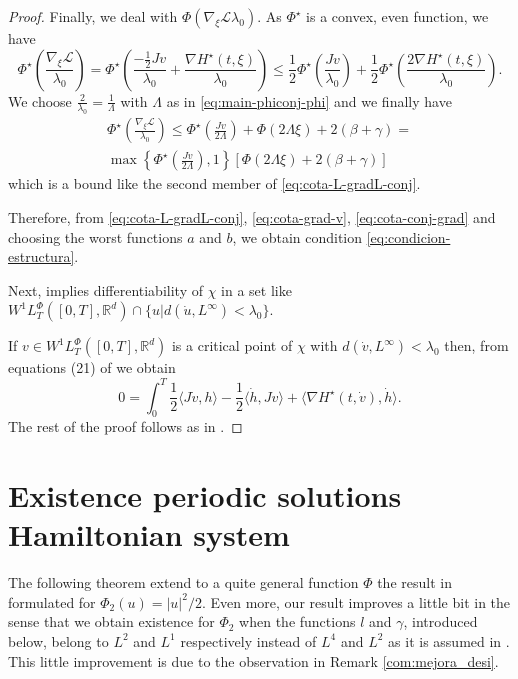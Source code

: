 \documentclass[twoside]{article}
\theoremstyle{remark}
\newcommand{\lphi}{L^{\Phi}}
\newcommand{\wphit}{W^{1}\lphi_T}
\newcommand{\rr}{\mathbb{R}}
\renewcommand{\leq}{\leqslant}
\begin{document}
\begin{proof}
Finally, we deal with $\Phi(\nabla_{\xi}\mathcal{L}{\lambda_0})$. 
As $\Phi^{\star}$ is a convex, even function, we have
\[\Phi^{\star}\left(\frac{\nabla_{\xi}\mathcal{L}}{\lambda_0}\right)=
\Phi^{\star}\left(\frac{-\frac{1}{2}Jv}{\lambda_0}+\frac{\nabla H^{\star}(t,\xi)}{\lambda_0}\right)
\leq
\frac{1}{2} \Phi^{\star}\left(\frac{Jv}{\lambda_0}\right)+
\frac{1}{2}\Phi^{\star}\left(\frac{2 \nabla H^{\star}(t,\xi)}{\lambda_0}\right).
\]
We choose $\frac{2}{\lambda_0}=\frac{1}{\Lambda}$ with $\Lambda$ as in \eqref{eq:main-phiconj-phi} and 
we finally have
\begin{equation}\label{eq:cota-conj-grad}
\begin{split}
\Phi^{\star}\left(\frac{\nabla_{\xi}\mathcal{L}}{\lambda_0}\right)\leq 
\Phi^{\star}\left(\frac{Jv}{2\Lambda}\right)+\Phi(2\Lambda\xi)+2(\beta+\gamma)=\\
\max\left\{\Phi^{\star}\left(\frac{Jv}{2\Lambda}\right),1\right\}
\left[\Phi(2\Lambda\xi)+2(\beta+\gamma)\right]
\end{split}
\end{equation}
which is a bound like the second member of \eqref{eq:cota-L-gradL-conj}.

Therefore, from \eqref{eq:cota-L-gradL-conj}, \eqref{eq:cota-grad-v}, \eqref{eq:cota-conj-grad} and choosing the worst functions $a$ and $b$, 
we obtain condition \eqref{eq:condicion-estructura}.

Next, \cite[Thm. 4.5]{MA2017} implies differentiability of $\chi$ in a set like 
$\wphit([0,T],\rr^d)\cap\{u|d(\dot{u},L^{\infty})<\lambda_0\}$.

If $v \in \wphit([0,T],\rr^d)$ is a critical point of $\chi$ with $d(\dot{v},L^{\infty})<\lambda_0$
then, from equations (21) of \cite{MA2017} we obtain
\[
0=\int_0^T \frac{1}{2} \langle J\dot{v},h\rangle-\frac{1}{2} \langle \dot{h},Jv \rangle
+\langle \nabla H^{\star}(t,\dot{v}),\dot{h} \rangle.
\]
The rest of the proof follows as in \cite{mawhin2010critical}.

\end{proof}


\section{Existence periodic solutions Hamiltonian system}

The following theorem extend  to a quite general function $\Phi$ the result in \cite[Thm. 3.1]{mawhin2010critical} formulated for $\Phi_2(u)=|u|^2/2$. Even more, our result improves a little bit  \cite[Thm. 3.1]{mawhin2010critical} in the sense that we obtain existence for $\Phi_2$ when the functions $l$ and $\gamma$,  introduced below, belong to  $L^2$ and $L^1$ respectively instead of $L^4$ and $L^2$ as it is assumed in
\cite[Thm. 3.1]{mawhin2010critical}. This little improvement is due to the observation in Remark \ref{com:mejora_desi}.
\end{document}
